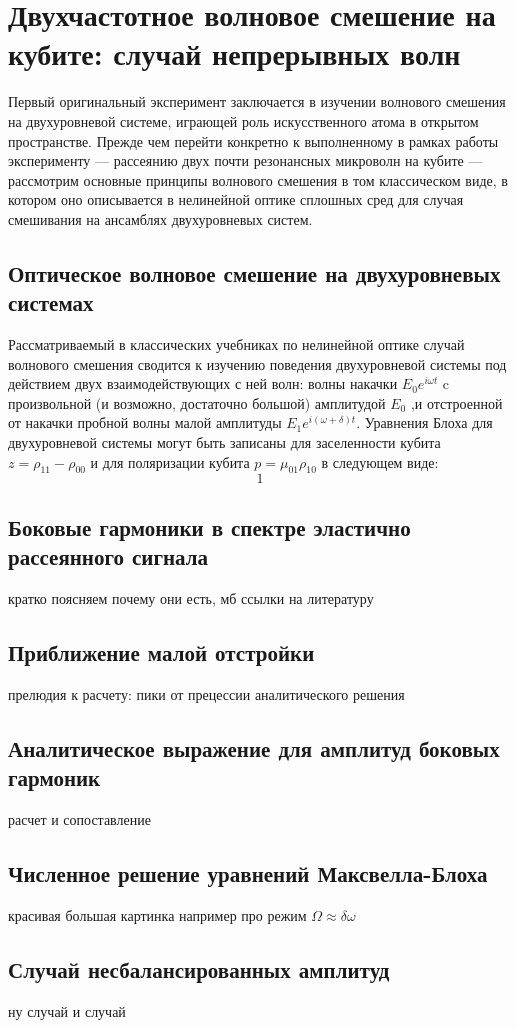 \chapter{Двухчастотное волновое смешение на кубите: случай непрерывных волн}
Первый оригинальный эксперимент заключается в изучении волнового смешения на двухуровневой системе, играющей роль искусственного атома в открытом пространстве. Прежде чем перейти конкретно к выполненному в рамках работы эксперименту --- рассеянию двух почти резонансных микроволн на кубите --- рассмотрим основные принципы волнового смешения в том классическом виде, в котором оно описывается в нелинейной оптике сплошных сред для случая смешивания на ансамблях двухуровневых систем.
\section{Оптическое волновое смешение на двухуровневых системах}
Рассматриваемый в классических учебниках по нелинейной оптике случай волнового смешения сводится к изучению поведения двухуровневой системы под действием двух взаимодействующих с ней волн: волны накачки $E_0e^{i\omega t}$ c произвольной (и возможно, достаточно большой) амплитудой $E_0$ ,и отстроенной от накачки пробной волны малой амплитуды $E_1e^{i(\omega+\delta) t}$. Уравнения Блоха для двухуровневой системы могут быть записаны для заселенности кубита $z = \rho_{11}-\rho_{00}$ и для поляризации кубита $p=\mu_{01}\rho_{10}$ в следующем виде:
\begin{equation}
1	
\end{equation}
\section{Боковые гармоники в спектре эластично рассеянного сигнала}
кратко поясняем почему они есть, мб ссылки на литературу
\section{Приближение малой отстройки}
прелюдия к расчету: пики от прецессии аналитического решения
\section{Аналитическое выражение для амплитуд боковых гармоник}
расчет и сопоставление
\section{Численное решение уравнений Максвелла-Блоха}
красивая большая картинка например про режим $\Omega \approx \delta \omega$
\section{Случай несбалансированных амплитуд}
 ну случай и случай